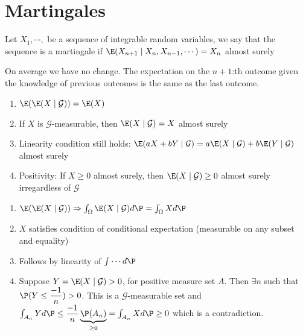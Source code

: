 \section{Martingales}\par
\begin{defo}[Martingale]{}
  Let $X_1,\cdots,$ be a sequence of integrable random variables, we say that the sequence is a martingale if $\E(X_{n+1}\mid X_n,X_{n-1},\cdots) = X_n$ almost surely
\end{defo}
\par\bigskip
\noindent On average we have no change. The expectation on the $n+1$:th outcome given the knowledge of previous outcomes is the same as the last outcome.
\par\bigskip
\begin{theo}{}
  \begin{enumerate}[leftmargin=*]
    \item $\E(\E(X\mid\mathcal{G})) = \E(X)$
    \item If $X$ is $\mathcal{G}$-measurable, then $\E(X\mid\mathcal{G}) = X$ almost surely
    \item Linearity condition still holds: $\E(aX+bY\mid \mathcal{G}) = a\E(X\mid\mathcal{G})+b\E(Y\mid\mathcal{G})$ almost surely
    \item Positivity: If $X\geq0$ almost surely, then $\E(X\mid\mathcal{G})\geq0$ almost surely irregardless of $\mathcal{G}$
  \end{enumerate}
\end{theo}
\par\bigskip
\begin{prf}{}
  \begin{enumerate}[leftmargin=*]
    \item $\E(\E(X\mid\mathcal{G}))\Rightarrow \int_\Omega\E(X\mid\mathcal{G})d\P =\int_\Omega Xd\P$
    \item $X$ satisfies condition of conditional expectation (measurable on any subset and equality)
    \item Follows by linearity of $\int \cdots d\P$
    \item Suppose $Y = \E(X\mid\mathcal{G}) >0$, for positive measure set $A$. Then $\exists n$ such that $\P(Y\leq\dfrac{-1}{n})>0$. This is a $\mathcal{G}$-measurable set and $\int_{A_n}Yd\P \leq \dfrac{-1}{n}\underbrace{\P(A_n)}_{\geq0} = \int_{A_n}X d\P\geq0$ which is a contradiction.
  \end{enumerate}
\end{prf}
